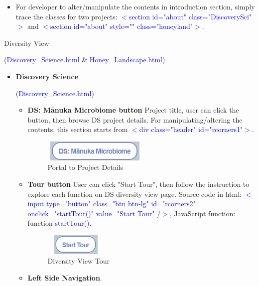 \documentclass{scrreprt}
\begin{document}
\begin{enumerate}
\begin{itemize}
\begin{itemize}
    \item For developer to alter/manipulate the contents in introduction section, simply trace the classes for two projects: \textcolor{blue}{$<$section id="about" class="DiscoverySci"$>$} and \textcolor{blue}{$<$section id="about" style="" class="honeyland"$>$}.
\end{itemize}
\end{itemize}
{\Large \item Diversity View} (\textcolor{blue}{Discovery\_Science.html} \& \textcolor{blue}{Honey\_Landscape.html})
\begin{itemize}
    \item \begin{large}\textbf{Discovery Science }\end{large}(\textcolor{blue}{Discovery\_Science.html})
    \begin{itemize}
        \item \textbf{DS: Mānuka Microbiome button}
        \newline
        Project title, user can click the button, then browse DS project details. For manipulating/altering the contents, this section starts from \textcolor{blue}{$<$div class="header" id="rcorners1"$>$}.
    \begin{figure}[h!]
    \centering
    \includegraphics[width=5cm,height=1cm]{DSbutton.PNG}
    \caption{Portal to Project Details}
    \label{fig:Start Tour}
\end{figure}
    \item \textbf{Tour button}
    \newline
    User can click "Start Tour", then follow the instruction to explore each function on DS diversity view page. Source code in html: \textcolor{blue}{$<$input type="button" class="btn btn-lg" id="rcorners2" onclick="startTour()" value="Start Tour" /$>$}, JavaScript function: \textcolor{VioletRed}{function} \textcolor{blue}{startTour()}. 
    \begin{figure}[h!]
    \centering
    \includegraphics[width=3cm,height=1cm]{Start Tour.PNG}
    \caption{Diversity View Tour}
    \label{fig:Start Tour}
\end{figure}
\item \textbf{Left Side Navigation}. 

\end{itemize}
\end{itemize}
\end{enumerate}
\end{document}
